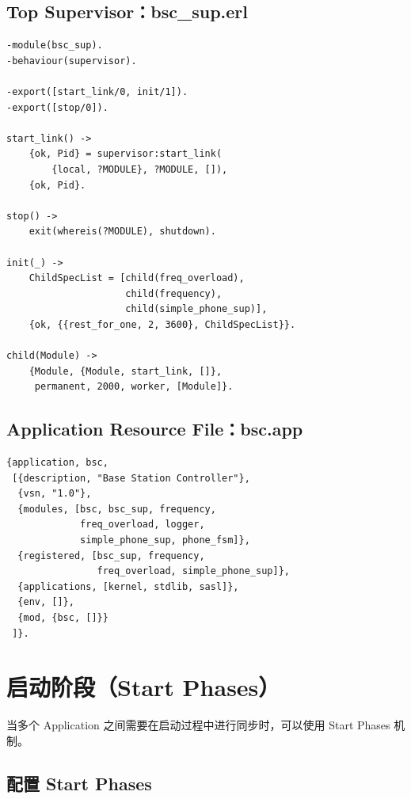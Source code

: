 \documentclass[a4paper,11pt]{article}
\begin{document}
\subsection{Top Supervisor：bsc\_sup.erl}

\begin{lstlisting}[style=erlangstyle, caption={bsc\_sup.erl --- Top Supervisor}]
-module(bsc_sup).
-behaviour(supervisor).

-export([start_link/0, init/1]).
-export([stop/0]).

start_link() ->
    {ok, Pid} = supervisor:start_link(
        {local, ?MODULE}, ?MODULE, []),
    {ok, Pid}.

stop() ->
    exit(whereis(?MODULE), shutdown).

init(_) ->
    ChildSpecList = [child(freq_overload),
                     child(frequency),
                     child(simple_phone_sup)],
    {ok, {{rest_for_one, 2, 3600}, ChildSpecList}}.

child(Module) ->
    {Module, {Module, start_link, []},
     permanent, 2000, worker, [Module]}.
\end{lstlisting}

\subsection{Application Resource File：bsc.app}

\begin{lstlisting}[style=erlangstyle, caption={bsc.app --- Application 资源文件}]
{application, bsc,
 [{description, "Base Station Controller"},
  {vsn, "1.0"},
  {modules, [bsc, bsc_sup, frequency,
             freq_overload, logger,
             simple_phone_sup, phone_fsm]},
  {registered, [bsc_sup, frequency,
                freq_overload, simple_phone_sup]},
  {applications, [kernel, stdlib, sasl]},
  {env, []},
  {mod, {bsc, []}}
 ]}.
\end{lstlisting}


\section{启动阶段（Start Phases）}

当多个 Application 之间需要在启动过程中进行同步时，可以使用 Start Phases 机制。

\subsection{配置 Start Phases}
\end{document}
